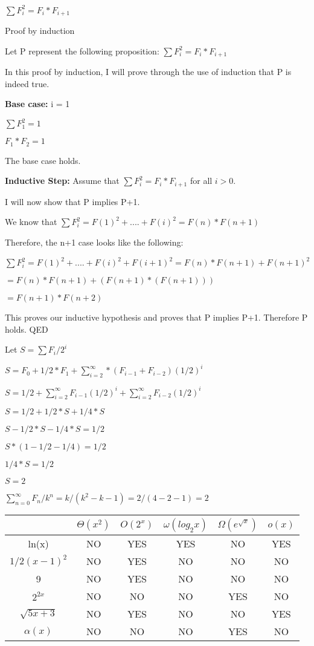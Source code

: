 \documentclass{6042}
\author{Ian Miller}
\begin{document}


$\sum{F_i^2} = F_i * F_{i+1}$

Proof by induction

Let P represent the following proposition: $\sum{F_i^2} = F_i * F_{i+1}$

In this proof by induction, I will prove through the use of induction that P is indeed true.

\textbf{Base case:} i = 1

$\sum{F_1^2} = 1$

$F_1 * F_2 = 1$

The base case holds.

\textbf{Inductive Step:} Assume that $\sum{F_i^2} = F_i * F_{i+1}$ for all $i > 0$.

I will now show that P implies P+1.

We know that $\sum{F_i^2} = F(1)^2 + .... + F(i)^2 = F(n) * F(n+1)$

Therefore, the n+1 case looks like the following:

$\sum{F_i^2} = F(1)^2 + .... + F(i)^2 + F(i+1)^2 = F(n) * F(n+1) + F(n+1)^2$

$= F(n) * F(n+1) + (F(n+1) * (F(n+1)))$

$= F(n+1) * F(n+2)$

This proves our inductive hypothesis and proves that P implies P+1. Therefore P holds. QED



Let $S = \sum{F_i/2^i}$ 

$S = F_0 + 1/2*F_1 + \sum_{i=2}^\infty * (F_{i-1} + F_{i-2})(1/2)^i$

$S = 1/2 + \sum_{i=2}^\infty F_{i-1}(1/2)^i + \sum_{i=2}^\infty F_{i-2}(1/2)^i$

$S = 1/2 + 1/2*S + 1/4 * S$

$S -1/2*S - 1/4*S = 1/2$

$S * (1 - 1/2 - 1/4) = 1/2$

$1/4 * S = 1/2$

$S = 2$



$\sum_{n=0}^\infty F_n/k^n = k / (k^2 - k - 1) = 2 / (4 - 2 - 1) = 2$




   \begin{tabular}{ |c|c|c|c|c|c| } 
    \hline
     & $\Theta(x^2)$ & $O(2^x)$ & $\omega(log_2 x)$ & $\Omega(e^{\sqrt{x}})$ & $o(x)$\\ \hline
    ln(x) & NO & YES & YES & NO & YES\\ \hline
    $1/2 (x-1)^2$ & NO & YES & NO & NO & NO\\\hline
    9 & NO & YES & NO & NO & NO\\ \hline
    $2^{2x}$ & NO & NO & NO & YES & NO\\ \hline
    $\sqrt{5x + 3}$ & NO & YES & NO & NO & YES\\ \hline
    $\alpha(x)$ & NO & NO & NO & YES & NO\\
    \hline
   \end{tabular}
\end{document}
